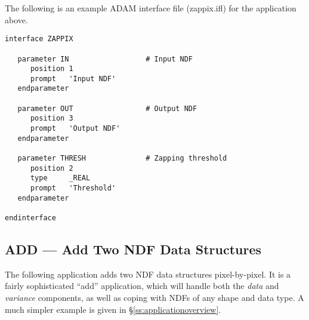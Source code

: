 \documentclass[twoside,11pt]{article}
\newcommand{\xref}[3]{#1}
\newcommand{\xlabel}[1]{}
\newcommand{\st}[1]{{\em{#1}}}
\begin{document}
The following is an example \xref{ADAM}{sg4}{} interface file
(zappix.ifl) for the application above. 

\small
\begin{verbatim}
interface ZAPPIX

   parameter IN                  # Input NDF
      position 1
      prompt   'Input NDF'
   endparameter

   parameter OUT                 # Output NDF
      position 3
      prompt   'Output NDF'
   endparameter

   parameter THRESH              # Zapping threshold
      position 2
      type     _REAL
      prompt   'Threshold'
   endparameter

endinterface
\end{verbatim}
\normalsize


\newpage
\subsection{\xlabel{ADD}\label{ss:addexample}ADD --- Add Two NDF Data Structures}

The following application adds two NDF data structures pixel-by-pixel. It is a
fairly sophisticated ``add'' application, which will handle both the
\st{data\/} and \st{variance\/} components, as well as coping with
NDFs of any 
shape and data type.  A much simpler example is given in
\S\ref{ss:applicationoverview}.
\end{document}
